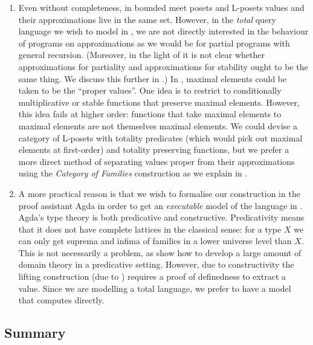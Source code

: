 \begin{enumerate}[leftmargin=*]
\item Even without completeness, in bounded meet posets and L-posets
  values and their approximations live in the same set. However, in
  the \emph{total} query language we wish to model in
  , we are not directly interested in the behaviour
  of programs on approximations as we would be for partial programs
  with general recursion. (Moreover, in the light of
   it is not clear whether
  approximations for partiality and approximations for stability ought
  to be the same thing. We discuss this further in
  .) In ,
  maximal elements could be taken to be the ``proper values''. One
  idea is to restrict to conditionally multiplicative or stable
  functions that preserve maximal elements. However, this idea fails
  at higher order: functions that take maximal elements to maximal
  elements are not themselves maximal elements. We could devise a
  category of L-posets with totality predicates (which would pick out
  maximal elements at first-order) and totality preserving functions,
  but we prefer a more direct method of separating values proper from
  their approximations using the \emph{Category of Families}
  construction as we explain in .
\item A more practical reason is that we wish to formalise our
  construction in the proof assistant Agda \cite{agda} in order to get
  an \emph{executable} model of the language in
  . Agda's type theory is both predicative and
  constructive. Predicativity means that it does not have complete
  lattices in the classical sense: for a type $X$ we can only get
  suprema and infima of families in a lower universe level than
  $X$. This is not necessarily a problem, as \citet{dejong21} show how
  to develop a large amount of domain theory in a predicative
  setting. However, due to constructivity the lifting construction
  (due to \citet{escardo-knapp}) requires a proof of definedness to
  extract a value. Since we are modelling a total language, we prefer
  to have a model that computes directly.
\end{enumerate}

\subsection{Summary}
\label{sec:diff-stab-summary}

